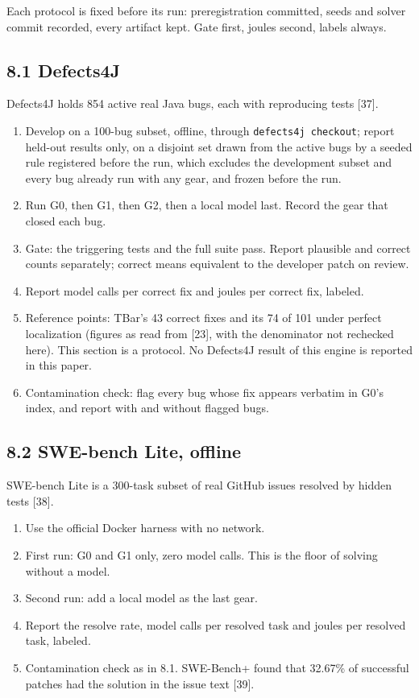 \documentclass[10pt,letterpaper]{article}
\providecommand{\tightlist}{\setlength{\itemsep}{1pt}\setlength{\parskip}{0pt}}
\begin{document}
Each protocol is fixed before its run: preregistration committed, seeds
and solver commit recorded, every artifact kept. Gate first, joules
second, labels always.

\subsection{8.1 Defects4J}\label{defects4j}

Defects4J holds 854 active real Java bugs, each with reproducing tests
{[}37{]}.

\begin{enumerate}
\def\labelenumi{\arabic{enumi}.}
\tightlist
\item
  Develop on a 100-bug subset, offline, through
  \texttt{defects4j\ checkout}; report held-out results only, on a
  disjoint set drawn from the active bugs by a seeded rule registered
  before the run, which excludes the development subset and every bug
  already run with any gear, and frozen before the run.
\item
  Run G0, then G1, then G2, then a local model last. Record the gear
  that closed each bug.
\item
  Gate: the triggering tests and the full suite pass. Report plausible
  and correct counts separately; correct means equivalent to the
  developer patch on review.
\item
  Report model calls per correct fix and joules per correct fix,
  labeled.
\item
  Reference points: TBar's 43 correct fixes and its 74 of 101 under
  perfect localization (figures as read from {[}23{]}, with the
  denominator not rechecked here). This section is a protocol. No
  Defects4J result of this engine is reported in this paper.
\item
  Contamination check: flag every bug whose fix appears verbatim in G0's
  index, and report with and without flagged bugs.
\end{enumerate}

\subsection{8.2 SWE-bench Lite, offline}\label{swe-bench-lite-offline}

SWE-bench Lite is a 300-task subset of real GitHub issues resolved by
hidden tests {[}38{]}.

\begin{enumerate}
\def\labelenumi{\arabic{enumi}.}
\tightlist
\item
  Use the official Docker harness with no network.
\item
  First run: G0 and G1 only, zero model calls. This is the floor of
  solving without a model.
\item
  Second run: add a local model as the last gear.
\item
  Report the resolve rate, model calls per resolved task and joules per
  resolved task, labeled.
\item
  Contamination check as in 8.1. SWE-Bench+ found that 32.67\% of
  successful patches had the solution in the issue text {[}39{]}.
\end{enumerate}
\end{document}
